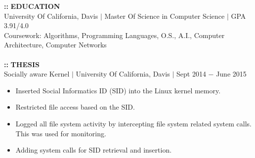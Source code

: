\documentclass[9pt,twosided,a4paper]{scrreprt}
\begin{document}
\LARGE \textbf{\color{red}\Huge::}  \textbf{EDUCATION}\\%
University Of California, Davis $|$ Master Of Science in Computer Science $|$ GPA 3.91/4.0\\%
\hspace{10pt}Coursework: Algorithms, Programming Languages, O.S., A.I., Computer Architecture, Computer Networks\\\\%
\LARGE \textbf{\color{red}\Huge::}  \textbf{THESIS}\\%
\LARGE Socially aware Kernel $|$ University Of California, Davis $|$ Sept 2014 $-$ June 2015 \vspace{-5pt}%
\begin{itemize}\itemsep0.4pt \parskip0pt %
\Large\item Inserted Social Informatics ID (SID) into the Linux kernel memory. 
\Large\item Restricted file access based on the SID.
\Large\item Logged all file system activity by intercepting file system related system calls. This was used for monitoring.
\Large\item Adding system calls for SID retrieval and insertion.
\end{itemize}%
\end{document}
